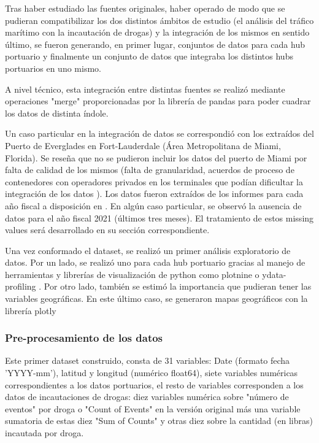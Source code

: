\documentclass{article}
\begin{document}
		Tras haber estudiado las fuentes originales, haber operado de modo que se pudieran compatibilizar los dos distintos ámbitos de estudio (el análisis del tráfico marítimo con la incautación de drogas) y la integración de los mismos en sentido último, se fueron generando, en primer lugar, conjuntos de datos para cada hub portuario y finalmente un conjunto de datos que integraba los distintos hubs portuarios en uno mismo.\cite[Puertos en el análisis]{} \
		
		A nivel técnico, esta integración entre distintas fuentes se realizó mediante operaciones "merge" proporcionadas por la librería de pandas para poder cuadrar los datos de distinta índole.\
		
		Un caso particular en la integración de datos se correspondió con los extraídos del Puerto de Everglades en Fort-Lauderdale (Área Metropolitana de Miami, Florida). Se reseña que no se pudieron incluir los datos del puerto de Miami por falta de calidad de los mismos (falta de granularidad, acuerdos de proceso de contenedores con operadores privados en los terminales que podían dificultar la integración de los datos \cite[]{}). Los datos fueron extraídos de los informes para cada año fiscal a disposición en \cite[]{}. En algún caso particular, se observó la ausencia de datos para el año fiscal 2021 (últimos tres meses). El tratamiento de estos missing values será desarrollado en su sección correspondiente.
		
		Una vez conformado el dataset, se realizó un primer análisis exploratorio de datos. Por un lado, se realizó uno para cada hub portuario gracias al manejo de herramientas y librerías de visualización de python como plotnine \cite[plotnine]{} o ydata-profiling \cite[ydata-profiling]{}. Por otro lado, también se estimó la importancia que pudieran tener las variables geográficas. En este último caso, se generaron mapas geográficos con la librería plotly \cite[plotly]{}
		
		
		
		
		\subsubsection{Pre-procesamiento de los datos}
		Este primer dataset construido, consta de 31 variables: Date (formato fecha 'YYYY-mm'), latitud y longitud (numérico float64), siete variables numéricas correspondientes a los datos portuarios, el resto de variables corresponden a los datos de incautaciones de drogas: diez variables numérica sobre "número de eventos" por droga o "Count of Events" en la versión original más una variable sumatoria de estas diez "Sum of Counts" y otras diez sobre la cantidad (en libras) incautada por droga.\
		
\end{document}

